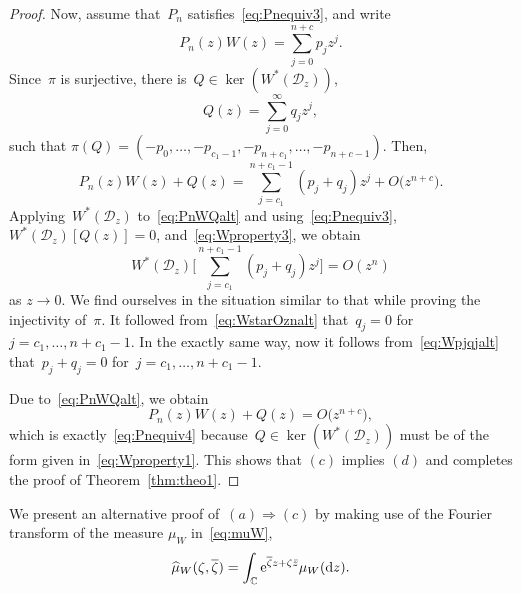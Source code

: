 \documentclass[pdftex]{sigma}
\numberwithin{equation}{section}
\newcommand*{\Cset}{\mathbb{C}} %
\begin{document}
\begin{proof}
 Now, assume that~$P_n$ satisfies~\eqref{eq:Pnequiv3}, and write
 \begin{equation*}
 P_n(z) W(z) = \sum_{j=0}^{n+c} p_j z^j.
 \end{equation*}
 Since~$\pi$ is surjective, there is~$Q \in \ker(W^*(\mathscr{D}_z))$,
 \begin{equation*}
 Q(z) = \sum_{j=0}^{\infty} q_j z^j,
 \end{equation*}
 such that
$
 \pi(Q) = (-p_0, \dots, -p_{c_1-1}, -p_{n+c_1}, \dots, -p_{n+c-1}).
$
 Then,
 \begin{equation}
 \label{eq:PnWQalt}
 P_n(z) W(z) + Q(z) = \sum_{j=c_1}^{n+c_1-1} (p_j + q_j) z^j + O\big(z^{n+c}\big).
 \end{equation}
 Applying~$W^*(\mathscr{D}_z)$ to~\eqref{eq:PnWQalt} and using~\eqref{eq:Pnequiv3}, $W^*(\mathscr{D}_z)[Q(z)]=0$, and~\eqref{eq:Wproperty3}, we obtain
 \begin{equation}
 \label{eq:Wpjqjalt}
 W^*(\mathscr{D}_z)\Bigg[\sum_{j=c_1}^{n+c_1-1} (p_j + q_j) z^j\bigg] = O(z^{n})
 \end{equation}
 as $z \to 0$. We find ourselves in the situation similar to that while proving the injectivity of~$\pi$. It followed from~\eqref{eq:WstarOznalt} that~$q_j = 0$ for~$j=c_1,\dots, n+c_1-1$. In the exactly same way, now it follows from~\eqref{eq:Wpjqjalt} that~$p_j+q_j = 0$ for~$j=c_1, \dots, n+c_1-1$.

 Due to~\eqref{eq:PnWQalt}, we obtain
 \begin{equation*}
 P_n(z) W(z) + Q(z) = O\big(z^{n+c}\big),
 \end{equation*}
 which is exactly~\eqref{eq:Pnequiv4} because~$Q \in \ker(W^*(\mathscr{D}_z))$ must be of the form given in~\eqref{eq:Wproperty1}. This shows that $(c)$ implies $(d)$ and completes the proof of Theorem~\ref{thm:theo1}.
 \end{proof}


 We present an alternative proof of~$(a) \Rightarrow (c)$ by making use of the Fourier transform of the measure $\mu_W$ in~\eqref{eq:muW},
 \begin{equation}
 \label{eq:muhat}
 \widehat{\mu}_W(\zeta, \overline{\zeta}) = \int_{\Cset} {\rm e}^{\overline{\zeta} z + \zeta \bar{z}} \mu_W({\rm d}z).
 \end{equation}
\end{document}
